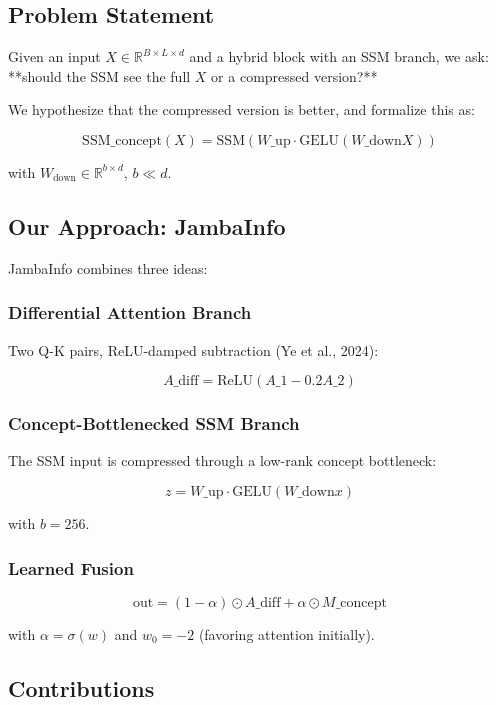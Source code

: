 \subsection{Problem Statement}

Given an input $X \in \mathbb{R}^{B \times L \times d}$ and a hybrid block 
with an SSM branch, we ask: **should the SSM see the full $X$ or a 
compressed version?**

We hypothesize that the compressed version is better, and formalize this as:

\[
\text{SSM}\_\text{concept}(X) = \text{SSM}\!\left(W\_\text{up} \cdot \text{GELU}(W\_\text{down} X)\right)
\tag{1.1}
\]

with $W_\text{down} \in \mathbb{R}^{b \times d}$, $b \ll d$.

\subsection{Our Approach: JambaInfo}

JambaInfo combines three ideas:

\subsubsection{Differential Attention Branch}

Two Q-K pairs, ReLU-damped subtraction (Ye et al., 2024):

\[
A\_\text{diff} = \text{ReLU}(A\_1 - 0.2 A\_2)
\tag{1.2}
\]

\subsubsection{Concept-Bottlenecked SSM Branch}

The SSM input is compressed through a low-rank concept bottleneck:

\[
z = W\_\text{up} \cdot \text{GELU}(W\_\text{down} x)
\tag{1.3}
\]

with $b = 256$.

\subsubsection{Learned Fusion}

\[
\text{out} = (1 - \alpha) \odot A\_\text{diff} + \alpha \odot M\_\text{concept}
\tag{1.4}
\]

with $\alpha = \sigma(w)$ and $w_0 = -2$ (favoring attention initially).

\subsection{Contributions}

